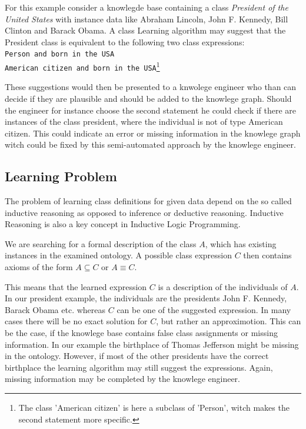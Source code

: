 \begin{example}
For this example consider a knowlegde base containing a class \emph{President of
the United States} with instance data like Abraham Lincoln, John F. Kennedy,
Bill Clinton and Barack Obama. A class Learning algorithm may suggest that the
President class is equivalent to the following two class expressions:
\\\hspace*{12pt}\texttt{Person and born in the USA}\\
\hspace*{12pt}\texttt{American citizen and born in the USA}\footnote{The class
'American citizen' is here a subclass of 'Person', witch makes the second
statement more specific.}
\end{example}

These suggestions would then be presented to a knwolege engineer who than can
decide if they are plausible and should be added to the knowlege graph. Should
the engineer for instance choose the second statement he could check if there
are instances of the class president, where the individual is not of type
American citizen. This could indicate an error or missing information in the
knowlege graph witch could be fixed by this semi-automated approach by the
knowlege engineer.


\subsection*{Learning Problem}
The problem of learning class definitions for given data depend on the so called
inductive reasoning as opposed to inference or deductive reasoning. \cite{paper1}
Inductive Reasoning is also a key concept in Inductive Logic Programming.

\begin{definition}
We are searching for a formal description of the class $A$, which has existing
instances in the examined ontology. A possible class expression $C$ then
contains axioms of the form $A \subseteq C$ or $A \equiv C$.
\end{definition}

This means that the learned expression $C$ is a description of the individuals
of $A$. In our president example, the individuals are the presidents John F.
Kennedy, Barack Obama etc. whereas $C$ can be one of the suggested expression.
In many cases there will be no exact solution for $C$, but rather an
approximotion. This can be the case, if the knowlege base contains false class
assignments or missing information. In our example the birthplace of Thomas
Jefferson might be missing in the ontology. However, if most of the other
presidents have the correct birthplace the learning algorithm may still suggest
the expressions. Again, missing information may be completed by the knowlege
engineer.


